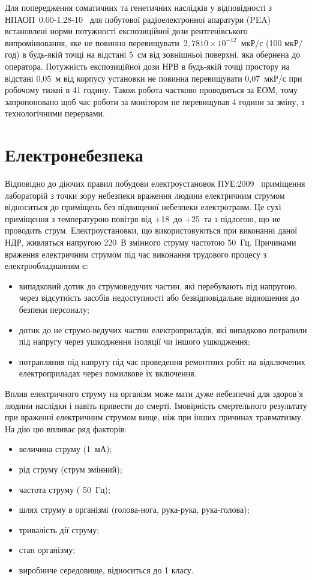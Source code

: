 \documentclass[a4paper,fontsize=14bp,ukrainian]{extreport}
\begin{document}
Для попередження соматичних та генетичних наслідків у відповідності з НПАОП~0.00-1.28-10~\cite{dsn:comp_machine} для побутової радіоелектронної апаратури (PEA) встановлені норми потужності експозиційної дози рентгенівського випромінювання, яке не повинно перевищувати~$2,7810\times 10^{-12}$~мкР/с (100 мкР/год) в будь-якій точці на відстані 5~см від зовнішньої поверхні, яка обернена до оператора. Потужність експозиційної дози НРВ в будь-якій точці простору на відстані 0,05~м від корпусу установки не повинна перевищувати 0,07~мкР/с при робочому тижні в 41 годину. Також робота частково проводиться за ЕОМ, тому запропоновано щоб час роботи за монітором не перевищував 4 години за зміну, з технологічними перервами.

\section{Електронебезпека}

Відповідно до діючих правил побудови електроустановок ПУЕ:2009~\cite{pue2009} приміщення лабораторій з точки зору небезпеки враження людини електричним струмом відноситься до приміщень без підвищеної небезпеки електротравм. Це сухі приміщення з температурою повітря від +18\cels~до +25\cels~та з підлогою, що не проводить струм. Електроустановки, що використовуються при виконанні даної НДР, живляться напругою 220~В змінного струму частотою 50~Гц. Причинами враження електричним струмом під час виконання трудового процесу з електрообладнанням є:
\begin{itemize}
\item випадковий дотик до струмоведучих частин, які перебувають під напругою, через відсутність засобів недоступності або безвідповідальне відношення до безпеки персоналу;
\item дотик до не струмо-ведучих частин електроприладів, які випадково потрапили під напругу через ушкодження ізоляції чи іншого ушкодження;
\item потрапляння під напругу під час проведення ремонтних робіт на відключених електроприладах через помилкове їх включення.
\end{itemize}

Вплив електричного струму на організм може мати дуже небезпечні для здоров’я людини наслідки і навіть привести до смерті. Імовірність смертельного результату при враженні електричним струмом вище, ніж при інших причинах травматизму. На дію цю впливає ряд факторів:
\begin{itemize}
\item величина струму (1~мА);
\item рід струму (струм змінний);
\item частота струму ( 50~Гц);
\item шлях струму в організмі (голова-нога, рука-рука, рука-голова);
\item тривалість дії струму;
\item стан організму;
\item виробниче середовище, відноситься до 1 класу.
\end{itemize}
\end{document}

